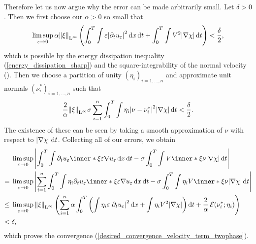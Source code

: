 Therefore let us now argue why the error can be made arbitrarily 
small. 
Let $ \delta > 0 $. Then we first choose our $ \alpha > 0 $ so small that 
\begin{equation*}
	\limsup_{ \varepsilon \to 0 }
	\alpha \norm{ \xi }_{ \operatorname{L}^{ \infty } }
	\left(
	\int_{ 0 }^{ T }
	\int
	\varepsilon 
	\abs{ \partial_{  t } u_{ \varepsilon } }^{ 2 }
	\dd{ x }
	\dd{ t }
	+
	\int_{ 0 }^{ T }
	\int
	V^{ 2 }
	\abs{ \nabla \chi }
	\dd{ t }
	\right)
	<
	\frac{ \delta }{ 2 },
\end{equation*}
which is possible by the energy dissipation inequality 
(\ref{energy_dissipation_sharp}) and the square-integrability of the normal 
velocity ().
Then we choose a partition of unity $ \left( \eta_{ i } \right)_{ i = 1 , 
\dotsc , n } $ and approximate unit normals $ \left( \nu^{ \ast }_{ i 
}\right)_{i = 1 , \dotsc, n } $ such that
\begin{equation*}
	\frac{ 2 }{ \alpha }
	\norm{ \xi }_{ \operatorname{L}^{ \infty } }
	\sigma
	\sum_{ i = 1 }^{ n }
	\int_{ 0 }^{ T }
	\int
	\eta_{ i }
	\abs{ \nu - \nu_{ i }^{ \ast } }^{ 2 }
	\abs{ \nabla \chi }
	\dd{ t }
	<
	\frac{ \delta }{2 }.
\end{equation*}
The existence of these can be seen by taking a smooth approximation of $ \nu $ 
with respect to $ \abs{ \nabla \chi } \dd{ t } $.
Collecting all of our errors, we obtain
\begin{align*}
	& \limsup_{ \varepsilon \to 0 }
	\abs{
		\int_{ 0 }^{ T }
		\int
		\partial_{  t } u_{ \varepsilon }
		\inner*{ \xi }{ \varepsilon \nabla u_{ \varepsilon } }
		\dd{ x }
		\dd{ t }
		-
		\sigma
		\int_{ 0 }^{ T }
		\int
		V \inner*{ \xi }{ \nu }
		\abs{ \nabla \chi }
		\dd{ t }
	}
	\\
	= {} &
	\limsup_{ \varepsilon \to 0 }
	\abs{
		\sum_{ i = 1 }^{ n }
		\int_{ 0 }^{ T }
		\int
		\eta_{ i }
		\partial_{  t } u_{ \varepsilon }
		\inner*{ \xi }{ \varepsilon \nabla u_{ \varepsilon } }
		\dd{ x }
		\dd{ t }
		-
		\sigma
		\int_{ 0 }^{ T }
		\int
		\eta_{ i }
		V \inner*{ \xi }{ \nu }
		\abs{ \nabla \chi }
		\dd{ t }
	}
	\\
	\leq {} & 
	\limsup_{ \varepsilon \to 0 }
	\norm{ \xi }_{ \lp^{ \infty } }
	\left(
	\sum_{ i = 1 }^{ n } 
	\alpha 
	\int_{ 0 }^{ T }
	\left(
	\int
	\eta_{ i }
	\varepsilon
	\abs{ \partial_{  t } u_{ \varepsilon } }^{ 2 }
	\dd{ x }
	+
	\int
	\eta_{ i }
	V^{ 2 }
	\abs{ \nabla \chi }
	\right)
	\dd{ t }
	+
	\frac{ 2 }{ \alpha }
	\tilt_excess ( \nu_{ i }^{ \ast } ; \eta_{ i } )
	\right)
	\\
	<{} & \delta,
\end{align*}
which proves the convergence (\ref{desired_convergence_velocity_term_twophase}).